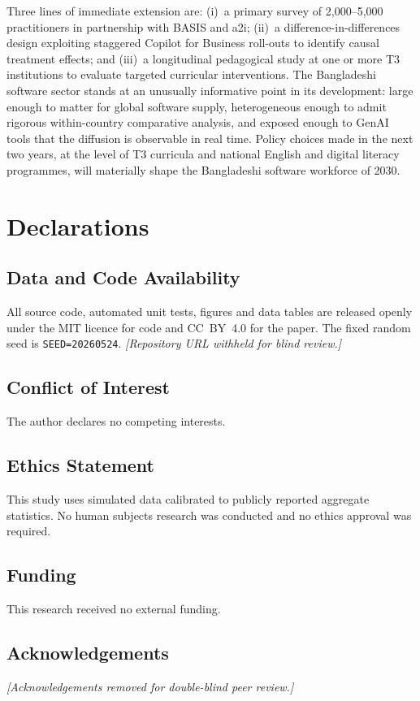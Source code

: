 \documentclass[11pt,a4paper]{article}
\begin{document}
Three lines of immediate extension are: (i)~a primary survey of
2{,}000--5{,}000 practitioners in partnership with BASIS and a2i;
(ii)~a difference-in-differences design exploiting staggered Copilot
for Business roll-outs to identify causal treatment effects; and
(iii)~a longitudinal pedagogical study at one or more T3 institutions
to evaluate targeted curricular interventions. The Bangladeshi
software sector stands at an unusually informative point in its
development: large enough to matter for global software supply,
heterogeneous enough to admit rigorous within-country comparative
analysis, and exposed enough to GenAI tools that the diffusion is
observable in real time. Policy choices made in the next two years,
at the level of T3 curricula and national English and digital
literacy programmes, will materially shape the Bangladeshi software
workforce of 2030.

\section*{Declarations}

\subsection*{Data and Code Availability}

All source code, automated unit tests, figures and data tables are
released openly under the MIT licence for code and CC~BY~4.0 for the
paper. The fixed random seed is \texttt{SEED=20260524}.
\textit{[Repository URL withheld for blind review.]}

\subsection*{Conflict of Interest}
The author declares no competing interests.

\subsection*{Ethics Statement}
This study uses simulated data calibrated to publicly reported
aggregate statistics. No human subjects research was conducted and
no ethics approval was required.

\subsection*{Funding}
This research received no external funding.

\subsection*{Acknowledgements}
\textit{[Acknowledgements removed for double-blind peer review.]}

\renewcommand{\refname}{References}


\end{document}
